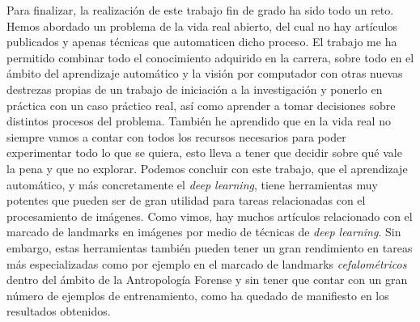 \medskip

\noindent Para finalizar, la realización de este trabajo fin de grado ha sido todo un reto. Hemos abordado un problema de la vida real abierto, del cual no hay artículos publicados y apenas técnicas que automaticen dicho proceso. El trabajo me ha permitido combinar todo el conocimiento adquirido en la carrera, sobre todo en el ámbito del aprendizaje automático y la visión por computador con otras nuevas destrezas propias de un trabajo de iniciación a la investigación y ponerlo en práctica con un caso práctico real, así como aprender a tomar decisiones sobre distintos procesos del problema. También he aprendido que en la vida real no siempre vamos a contar con todos los recursos necesarios para poder experimentar todo lo que se quiera, esto lleva a tener que decidir sobre qué vale la pena y que no explorar. Podemos concluir con este trabajo, que el aprendizaje automático, y más concretamente el \textit{deep learning}, tiene herramientas muy potentes que pueden ser de gran utilidad para tareas relacionadas con el procesamiento de imágenes. Como vimos, hay muchos artículos relacionado con el marcado de landmarks en imágenes por medio de técnicas de \textit{deep learning}. Sin embargo, estas herramientas también pueden tener un gran rendimiento en tareas más especializadas como por ejemplo en el marcado de landmarks \textit{cefalométricos} dentro del ámbito de la Antropología Forense y sin tener que contar con un gran número de ejemplos de entrenamiento, como ha quedado de manifiesto en los resultados obtenidos.


\endinput

